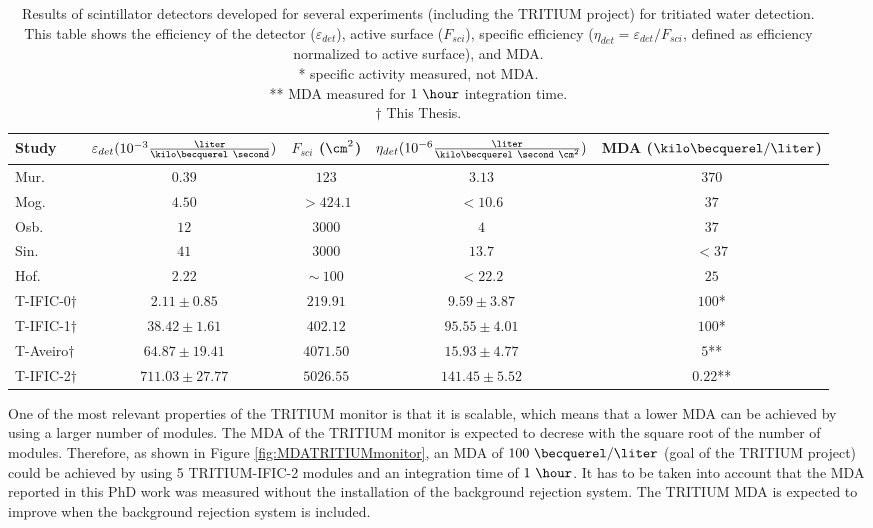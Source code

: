 \begin{enumerate}
\begin{table}[htbp]
\centering{}%
\begin{tabular}{lcccc}
\toprule 
Study & \parbox{5.5em}{$\varepsilon_{det}(10^{-3}\frac{\liter}{\kilo\becquerel~\second})$}  & \parbox{4.5em}{$F_{sci}$ ($\cm^2$)}  & \parbox{6.5em}{$\eta_{det}(10^{-6}\frac{\liter}{\kilo\becquerel~\second~\cm^2})$} & MDA ($\kilo\becquerel / \liter$) \tabularnewline
\midrule
\midrule 
Mur. \cite{Muramatsu} & $0.39$ & $123$ & $3.13$ & $370$ \tabularnewline
Mog. \cite{Moghissi} & $4.50$ & $>424.1$ & $<10.6$ & $37$ \tabularnewline
Osb. \cite{Osborne} & $12$ & $3000$ & $4$ & $37$ \tabularnewline
Sin. \cite{Ratnakaran} & $41$ & $3000$ & $13.7$ & $<37$ \tabularnewline
Hof. \cite{Hofstetter1} & $2.22$ & $\sim~100$ & $<22.2$ & $25$ \tabularnewline
T-IFIC-0$\dagger$ & $2.11 \pm 0.85$ & $219.91$ & $9.59 \pm 3.87$ & $100$* \tabularnewline
T-IFIC-1$\dagger$ & $38.42 \pm 1.61$ & $402.12$ & $95.55 \pm 4.01$ & $100$* \tabularnewline
T-Aveiro$\dagger$ & $64.87 \pm 19.41$ & $4071.50$ & $15.93 \pm 4.77$ & $5$** \tabularnewline
T-IFIC-2$\dagger$ & $711.03 \pm 27.77$ & $5026.55$ & $141.45 \pm 5.52$ & $0.22$** \tabularnewline
\bottomrule
\end{tabular}
\caption{Results of scintillator detectors developed for several experiments (including the TRITIUM project) for tritiated water detection. This table shows the efficiency of the detector ($\varepsilon_{det}$), active surface ($F_{sci}$), specific efficiency ($\eta_{det}=\varepsilon_{det}/F_{sci}$, defined as efficiency normalized to active surface), and MDA.\\
* specific activity measured, not MDA.\\ 
** MDA measured for $1~\hour$ integration time.\\
$\dagger$ This Thesis.}
\label{tab:ComparisonResultsTritium}
\end{table}

One of the most relevant properties of the TRITIUM monitor is that it is scalable, which means that a lower MDA can be achieved by using a larger number of modules. The MDA of the TRITIUM monitor is expected to decrese with the square root of the number of modules. Therefore, as shown in Figure \ref{fig:MDATRITIUMmonitor}, an MDA of  $100~\becquerel/\liter$ (goal of the TRITIUM project) could be achieved by using 5 TRITIUM-IFIC-2 modules and an integration time of $1~\hour$. It has to be taken into account that the MDA reported in this PhD work was measured without the installation of the background rejection system. The TRITIUM MDA is expected to improve when the background rejection system is included.


\end{enumerate}
